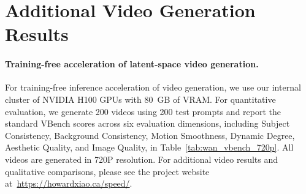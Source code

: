 \section{Additional Video Generation Results}
\label{sec:video_generation}

\paragraph{Training-free acceleration of latent-space video generation.} For training-free inference acceleration of video generation, we use our internal cluster of NVIDIA H100 GPUs with 80~GB of VRAM. For quantitative evaluation, we generate 200 videos using 200 test prompts and report the standard VBench scores across six evaluation dimensions, including Subject Consistency, Background Consistency, Motion Smoothness, Dynamic Degree, Aesthetic Quality, and Image Quality, in Table~\ref{tab:wan_vbench_720p}. All videos are generated in 720P resolution. For additional video results and qualitative comparisons, please see the project website at~\url{https://howardxiao.ca/speed/}.
